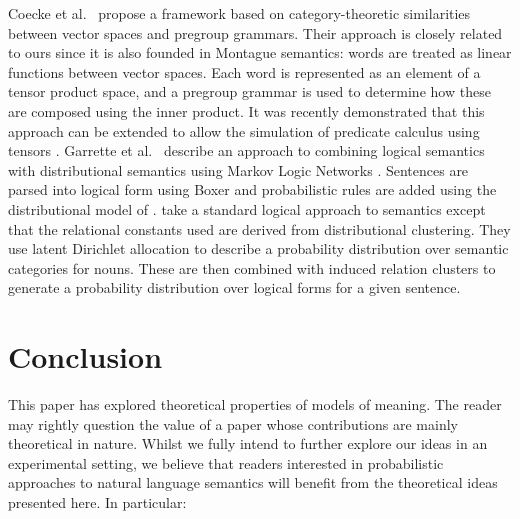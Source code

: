 \documentclass[a4paper,11pt]{article}
\renewcommand{\cite}{\citep}
\newcommand{\newcite}[1]{\citet{#1}}
\theoremstyle{definition}
\begin{document}
Coecke et al.~\cite{Coecke:10} propose a framework based on category-theoretic
similarities between vector spaces and pregroup grammars. Their
approach is closely related to ours since it is also
founded in Montague semantics: words are treated as linear functions
between vector spaces. Each word is represented as an element of a
tensor product space, and a pregroup grammar is used to determine how
these are composed using the inner product. It was recently
demonstrated that this approach can be extended to allow the
simulation of predicate calculus using
tensors \cite{Grefenstette:13}.
%
Garrette et al.~\cite{Garrette:11} describe an approach to combining logical
semantics with distributional semantics using Markov Logic Networks
\cite{Richardson:06}. Sentences are parsed into logical form using
Boxer \cite{Bos:04} and probabilistic rules are added using the
distributional model of \cite{Erk:10}. \newcite{Lewis:13} take a standard logical approach to
semantics except that the relational constants used are derived from
distributional clustering. They use latent Dirichlet allocation to
describe a probability distribution over semantic categories for
nouns. These are then combined with induced relation clusters to
generate a probability distribution over logical forms for a given
sentence.

\section{Conclusion}

This paper has explored theoretical properties of models of meaning. The
reader may rightly question the value of a paper whose contributions
are mainly theoretical in nature. Whilst we fully intend to further explore
our ideas in an experimental setting, we believe that readers
interested in probabilistic approaches to natural language semantics
will benefit from the theoretical ideas presented here. In particular:
\end{document}
